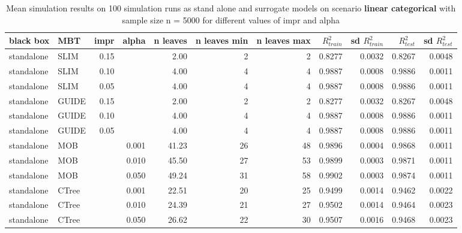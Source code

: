\begin{table}[!htb]

\caption{Mean simulation results on 100 simulation runs as stand alone and surrogate models on scenario \textbf{linear categorical} with sample size n = 5000 for different values of impr and alpha}
\centering \tiny
\begin{tabular}[t]{l|l|r|r|r|r|r|r|r|r|r}
\hline
black box & MBT & impr & alpha & n leaves & n leaves min & n leaves max &  $R^2_{train}$ & sd $R^2_{train}$ & $R^2_{test}$ & sd $R^2_{test}$\\
\hline
standalone & SLIM & 0.15 & & 2.00 & 2 & 2 & 0.8277 & 0.0032 & 0.8267 & 0.0048\\
standalone & SLIM & 0.10 & & 4.00 & 4 & 4 & 0.9887 & 0.0008 & 0.9886 & 0.0011\\
standalone & SLIM & 0.05 & & 4.00 & 4 & 4 & 0.9887 & 0.0008 & 0.9886 & 0.0011\\
standalone & GUIDE & 0.15 & & 2.00 & 2 & 2 & 0.8277 & 0.0032 & 0.8267 & 0.0048\\
standalone & GUIDE & 0.10 & & 4.00 & 4 & 4 & 0.9887 & 0.0008 & 0.9886 & 0.0011\\
standalone & GUIDE & 0.05 & & 4.00 & 4 & 4 & 0.9887 & 0.0008 & 0.9886 & 0.0011\\
standalone & MOB & & 0.001 & 41.23 & 26 & 48 & 0.9896 & 0.0004 & 0.9868 & 0.0011\\
standalone & MOB & & 0.010 & 45.50 & 27 & 53 & 0.9899 & 0.0003 & 0.9871 & 0.0011\\
standalone & MOB & & 0.050 & 49.24 & 31 & 58 & 0.9902 & 0.0003 & 0.9874 & 0.0011\\
standalone & CTree & & 0.001 & 22.51 & 20 & 25 & 0.9499 & 0.0014 & 0.9462 & 0.0022\\
standalone & CTree & & 0.010 & 24.39 & 21 & 27 & 0.9502 & 0.0014 & 0.9464 & 0.0023\\
standalone & CTree & & 0.050 & 26.62 & 22 & 30 & 0.9507 & 0.0016 & 0.9468 & 0.0023\\


\end{tabular}
\end{table}
